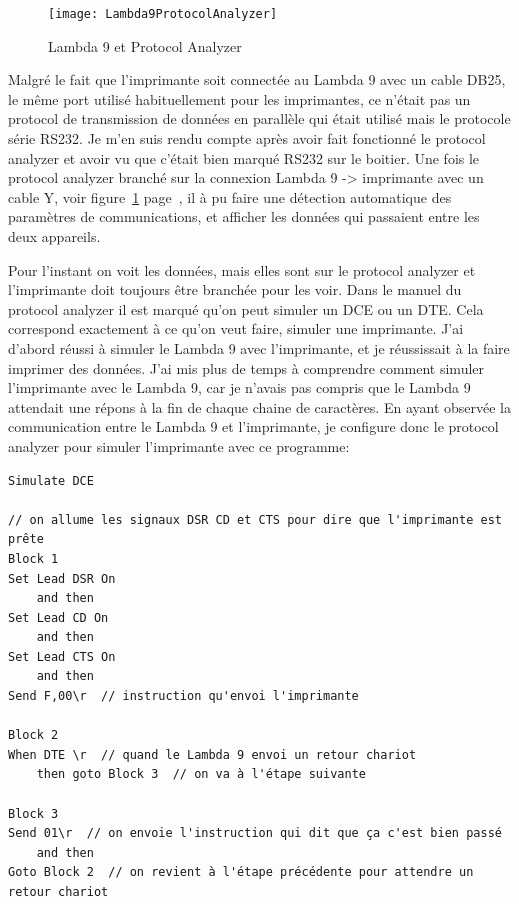 \documentclass[a4paper, 12pt]{article}
\begin{document}
\begin{figure}[h]
	\centering
	\texttt{[image: Lambda9ProtocolAnalyzer]}
	\caption{Lambda 9 et Protocol Analyzer}
	\label{fig:lambda9HP}
\end{figure}


Malgré le fait que l'imprimante soit connectée au Lambda 9 avec un cable DB25, le même port utilisé habituellement pour les imprimantes, ce n'était pas un protocol de transmission de données en parallèle qui était utilisé mais le protocole série RS232.
Je m'en suis rendu compte après avoir fait fonctionné le protocol analyzer et avoir vu que c'était bien marqué RS232 sur le boitier.  
Une fois le protocol analyzer branché sur la connexion Lambda 9 -> imprimante avec un cable Y, voir figure~\ref{fig:lambda9HP} page~\pageref{fig:lambda9HP}, il à pu faire une détection automatique des paramètres de communications, et afficher les données qui passaient entre les deux appareils.

Pour l'instant on voit les données, mais elles sont sur le protocol analyzer et l'imprimante doit toujours être branchée pour les voir.
Dans le manuel du protocol analyzer il est marqué qu'on peut simuler un DCE ou un DTE.
Cela correspond exactement à ce qu'on veut faire, simuler une imprimante.
J'ai d'abord réussi à simuler le Lambda 9 avec l'imprimante, et je réussissait à la faire imprimer des données.  
J'ai mis plus de temps à comprendre comment simuler l'imprimante avec le Lambda 9, car je n'avais pas compris que le Lambda 9 attendait une répons à la fin de chaque chaine de caractères.
En ayant observée la communication entre le Lambda 9 et l'imprimante, je configure donc le protocol analyzer pour simuler l'imprimante avec ce programme:

\begin{lstlisting}  
Simulate DCE  

// on allume les signaux DSR CD et CTS pour dire que l'imprimante est prête
Block 1  
Set Lead DSR On  
	and then  
Set Lead CD On  
	and then  
Set Lead CTS On  
	and then  
Send F,00\r  // instruction qu'envoi l'imprimante 
  
Block 2  
When DTE \r  // quand le Lambda 9 envoi un retour chariot
	then goto Block 3  // on va à l'étape suivante
  
Block 3  
Send 01\r  // on envoie l'instruction qui dit que ça c'est bien passé
	and then  
Goto Block 2  // on revient à l'étape précédente pour attendre un retour chariot
\end{lstlisting}  
\end{document}
